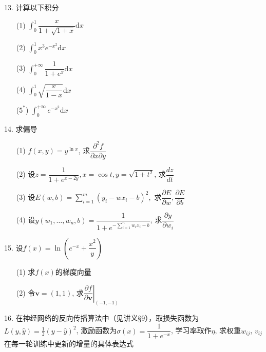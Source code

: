 
\begin{frame}

13. 计算以下积分
\begin{itemize}
\item[(1)] $\displaystyle \int_0^1 \dfrac{x}{1+\sqrt{1+x}} \mathrm{d}x$
\item[(2)] $\displaystyle \int_0^1 x^3e^{-x^2} \mathrm{d}x$
\item[(3)] $\displaystyle \int_0^{+\infty} \dfrac{1}{1+e^x} \mathrm{d}x$
\item[(4)] $\displaystyle \int_0^1 \sqrt{\dfrac{x}{1-x}} \mathrm{d}x$
\item[($5^*$)] $\displaystyle \int_0^{+\infty} e^{-x^2} \mathrm{d}x$
\end{itemize}

\end{frame}


\begin{frame}

14. 求偏导
\begin{itemize}
\item[(1)] $f(x,y)=y^{\ln x}$, 求$\dfrac{\partial^2 f}{\partial x \partial y}$
\item[(2)] 设$z = \dfrac{1}{1+e^{x-2y}}, x = \cos t, y = \sqrt{1+t^2}$, 求$\dfrac{dz}{dt}$
\item[(3)] 设$E(w,b) = \sum\limits_{i=1}^m (y_i-wx_i-b)^2,$ 求$\dfrac{\partial E}{\partial w}, \dfrac{\partial E}{\partial b}$
\item[(4)] 设$y(w_1,\ldots,w_n,b) = \dfrac{1}{1+e^{-\sum\limits_{i=1}^n w_ix_i - b}}$, 求$\dfrac{\partial y}{\partial w_i}$
\end{itemize}

\end{frame}


\begin{frame}

15. 设$f(x) = \ln \left(e^{-x} + \dfrac{x^2}{y} \right)$
\begin{itemize}
\item[(1)] 求$f(x)$的梯度向量
\item[(2)] 令$\mathbf{v} = (1,1)$, 求$\left. \dfrac{\partial f}{\partial \mathbf{v}} \right|_{(-1,-1)}$
\end{itemize}

\vspace{1em}

16. 在神经网络的反向传播算法中（见讲义\S 9），取损失函数为$L(y,\widehat{y}) = \frac{1}{2}(y-\widehat{y})^2$, 激励函数为$\sigma(x) = \dfrac{1}{1+e^{-x}}$, 学习率取作$\eta$, 求权重$w_{ij}$, $v_{ij}$在每一轮训练中更新的增量的具体表达式

\end{frame}


